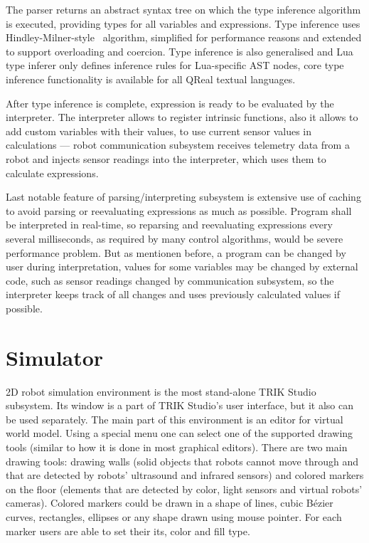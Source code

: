 \documentclass[conference]{IEEEtran}
\begin{document}
The parser returns an abstract syntax tree on which the type inference algorithm is executed, providing types for all variables and expressions. Type inference uses Hindley-Milner-style~\cite{damas1982principal} algorithm, simplified for performance reasons and extended to support overloading and coercion. Type inference is also generalised and Lua type inferer only defines inference rules for Lua-specific AST nodes, core type inference functionality is available for all QReal textual languages.

After type inference is complete, expression is ready to be evaluated by the interpreter. The interpreter allows to register intrinsic functions, also it allows to add custom variables with their values, to use current sensor values in calculations --- robot communication subsystem receives telemetry data from a robot and injects sensor readings into the interpreter, which uses them to calculate expressions.

Last notable feature of parsing/interpreting subsystem is extensive use of caching to avoid parsing or reevaluating expressions as much as possible. Program shall be interpreted in real-time, so reparsing and reevaluating expressions every several milliseconds, as required by many control algorithms, would be severe performance problem. But as mentionen before, a program can be changed by user during interpretation, values for some variables may be changed by external code, such as sensor readings changed by communication subsystem, so the interpreter keeps track of all changes and uses previously calculated values if possible.

\section{Simulator}
\label{chapter:2dModel}

2D robot simulation environment is the most stand-alone TRIK Studio subsystem. Its window is a part of TRIK Studio's user interface, but it also can be used separately. The main part of this environment is an editor for virtual world model. Using a special menu one can select one of the supported drawing tools (similar to how it is done in most graphical editors). There are two main drawing tools: drawing walls (solid objects that robots cannot move through and that are detected by robots' ultrasound and infrared sensors) and colored markers on the floor (elements that are detected by color, light sensors and virtual robots' cameras). Colored markers could be drawn in a shape of lines, cubic Bézier curves, rectangles, ellipses or any shape drawn using mouse pointer. For each marker users are able to set their its, color and fill type. 
\end{document}
